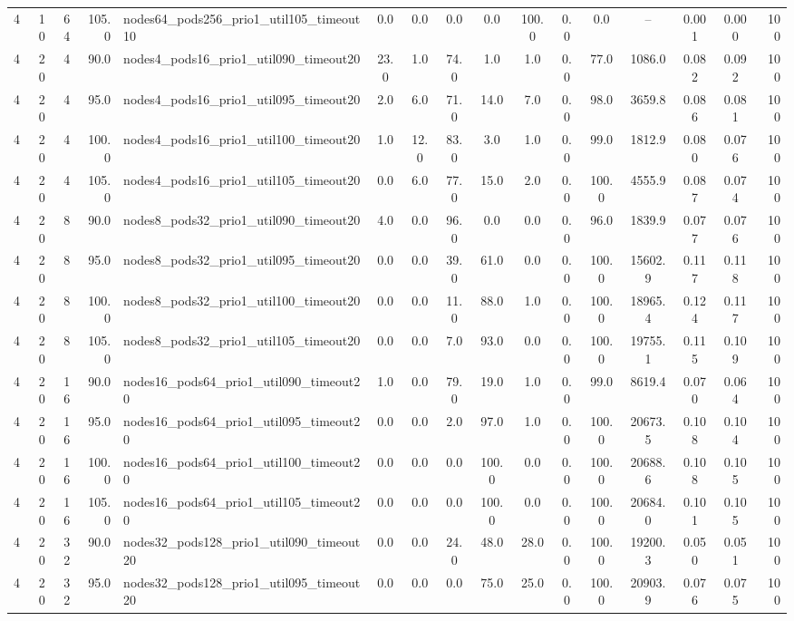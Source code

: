 \begin{tabular}{r r r r l c c c c c c c c c c r}
4 & 10 & 64 & 105.0 & nodes64\_pods256\_prio1\_util105\_timeout10 & 0.0 & 0.0 & 0.0 & 0.0 & 100.0 & 0.0 & 0.0 & -- & 0.001 & 0.000 & 100 \\
4 & 20 & 4 & 90.0 & nodes4\_pods16\_prio1\_util090\_timeout20 & 23.0 & 1.0 & 74.0 & 1.0 & 1.0 & 0.0 & 77.0 & 1086.0 & 0.082 & 0.092 & 100 \\
4 & 20 & 4 & 95.0 & nodes4\_pods16\_prio1\_util095\_timeout20 & 2.0 & 6.0 & 71.0 & 14.0 & 7.0 & 0.0 & 98.0 & 3659.8 & 0.086 & 0.081 & 100 \\
4 & 20 & 4 & 100.0 & nodes4\_pods16\_prio1\_util100\_timeout20 & 1.0 & 12.0 & 83.0 & 3.0 & 1.0 & 0.0 & 99.0 & 1812.9 & 0.080 & 0.076 & 100 \\
4 & 20 & 4 & 105.0 & nodes4\_pods16\_prio1\_util105\_timeout20 & 0.0 & 6.0 & 77.0 & 15.0 & 2.0 & 0.0 & 100.0 & 4555.9 & 0.087 & 0.074 & 100 \\
4 & 20 & 8 & 90.0 & nodes8\_pods32\_prio1\_util090\_timeout20 & 4.0 & 0.0 & 96.0 & 0.0 & 0.0 & 0.0 & 96.0 & 1839.9 & 0.077 & 0.076 & 100 \\
4 & 20 & 8 & 95.0 & nodes8\_pods32\_prio1\_util095\_timeout20 & 0.0 & 0.0 & 39.0 & 61.0 & 0.0 & 0.0 & 100.0 & 15602.9 & 0.117 & 0.118 & 100 \\
4 & 20 & 8 & 100.0 & nodes8\_pods32\_prio1\_util100\_timeout20 & 0.0 & 0.0 & 11.0 & 88.0 & 1.0 & 0.0 & 100.0 & 18965.4 & 0.124 & 0.117 & 100 \\
4 & 20 & 8 & 105.0 & nodes8\_pods32\_prio1\_util105\_timeout20 & 0.0 & 0.0 & 7.0 & 93.0 & 0.0 & 0.0 & 100.0 & 19755.1 & 0.115 & 0.109 & 100 \\
4 & 20 & 16 & 90.0 & nodes16\_pods64\_prio1\_util090\_timeout20 & 1.0 & 0.0 & 79.0 & 19.0 & 1.0 & 0.0 & 99.0 & 8619.4 & 0.070 & 0.064 & 100 \\
4 & 20 & 16 & 95.0 & nodes16\_pods64\_prio1\_util095\_timeout20 & 0.0 & 0.0 & 2.0 & 97.0 & 1.0 & 0.0 & 100.0 & 20673.5 & 0.108 & 0.104 & 100 \\
4 & 20 & 16 & 100.0 & nodes16\_pods64\_prio1\_util100\_timeout20 & 0.0 & 0.0 & 0.0 & 100.0 & 0.0 & 0.0 & 100.0 & 20688.6 & 0.108 & 0.105 & 100 \\
4 & 20 & 16 & 105.0 & nodes16\_pods64\_prio1\_util105\_timeout20 & 0.0 & 0.0 & 0.0 & 100.0 & 0.0 & 0.0 & 100.0 & 20684.0 & 0.101 & 0.105 & 100 \\
4 & 20 & 32 & 90.0 & nodes32\_pods128\_prio1\_util090\_timeout20 & 0.0 & 0.0 & 24.0 & 48.0 & 28.0 & 0.0 & 100.0 & 19200.3 & 0.050 & 0.051 & 100 \\
4 & 20 & 32 & 95.0 & nodes32\_pods128\_prio1\_util095\_timeout20 & 0.0 & 0.0 & 0.0 & 75.0 & 25.0 & 0.0 & 100.0 & 20903.9 & 0.076 & 0.075 & 100 \\

\end{tabular}
